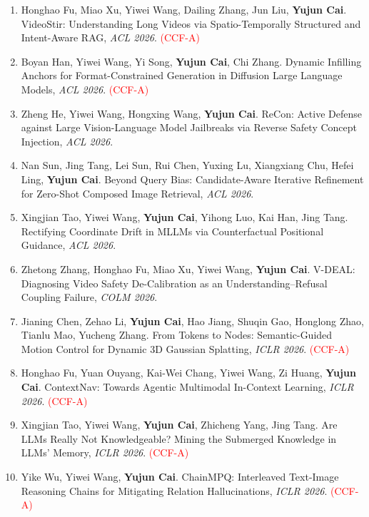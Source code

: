 \documentclass[11pt,letterpaper]{article}
\begin{document}
\begin{enumerate}
\item Honghao Fu, Miao Xu, Yiwei Wang, Dailing Zhang, Jun Liu, \textbf{Yujun Cai}. VideoStir: Understanding Long Videos via Spatio-Temporally Structured and Intent-Aware RAG, \textit{ACL 2026}. \textcolor{red}{(CCF-A)}

\item Boyan Han, Yiwei Wang, Yi Song, \textbf{Yujun Cai}, Chi Zhang. Dynamic Infilling Anchors for Format-Constrained Generation in Diffusion Large Language Models, \textit{ACL 2026}. \textcolor{red}{(CCF-A)}

\item Zheng He, Yiwei Wang, Hongxing Wang, \textbf{Yujun Cai}. ReCon: Active Defense against Large Vision-Language Model Jailbreaks via Reverse Safety Concept Injection, \textit{ACL 2026}.

\item Nan Sun, Jing Tang, Lei Sun, Rui Chen, Yuxing Lu, Xiangxiang Chu, Hefei Ling, \textbf{Yujun Cai}. Beyond Query Bias: Candidate-Aware Iterative Refinement for Zero-Shot Composed Image Retrieval, \textit{ACL 2026}.

\item Xingjian Tao, Yiwei Wang, \textbf{Yujun Cai}, Yihong Luo, Kai Han, Jing Tang. Rectifying Coordinate Drift in MLLMs via Counterfactual Positional Guidance, \textit{ACL 2026}.

\item Zhetong Zhang, Honghao Fu, Miao Xu, Yiwei Wang, \textbf{Yujun Cai}. V-DEAL: Diagnosing Video Safety De-Calibration as an Understanding--Refusal Coupling Failure, \textit{COLM 2026}.

\item Jianing Chen, Zehao Li, \textbf{Yujun Cai}, Hao Jiang, Shuqin Gao, Honglong Zhao, Tianlu Mao, Yucheng Zhang. From Tokens to Nodes: Semantic-Guided Motion Control for Dynamic 3D Gaussian Splatting, \textit{ICLR 2026}. \textcolor{red}{(CCF-A)}

\item Honghao Fu, Yuan Ouyang, Kai-Wei Chang, Yiwei Wang, Zi Huang, \textbf{Yujun Cai}. ContextNav: Towards Agentic Multimodal In-Context Learning, \textit{ICLR 2026}. \textcolor{red}{(CCF-A)}

\item Xingjian Tao, Yiwei Wang, \textbf{Yujun Cai}, Zhicheng Yang, Jing Tang. Are LLMs Really Not Knowledgeable? Mining the Submerged Knowledge in LLMs' Memory, \textit{ICLR 2026}. \textcolor{red}{(CCF-A)}

\item Yike Wu, Yiwei Wang, \textbf{Yujun Cai}. ChainMPQ: Interleaved Text-Image Reasoning Chains for Mitigating Relation Hallucinations, \textit{ICLR 2026}. \textcolor{red}{(CCF-A)}


\end{enumerate}
\end{document}
